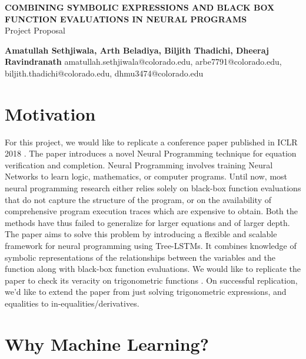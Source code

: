 \documentclass{article}
\begin{document}
\begin{center}
	\LARGE{\textbf{COMBINING SYMBOLIC EXPRESSIONS AND BLACK BOX FUNCTION EVALUATIONS IN NEURAL PROGRAMS}} \\
    \vspace{1em}
    \Large{Project Proposal} \\
    \vspace{1em}
        
    \normalsize\textbf{Amatullah Sethjiwala, Arth Beladiya, Biljith Thadichi, Dheeraj Ravindranath} 
    \normalsize{amatullah.sethjiwala@colorado.edu, arbe7791@colorado.edu, biljith.thadichi@colorado.edu, dhmu3474@colorado.edu}
\end{center}
	
\begin{normalsize}
    
\section{Motivation}

For this project, we would like to replicate a conference paper published in ICLR 2018 \cite{originalpaper}. The paper introduces a novel Neural Programming technique for equation verification and completion. Neural Programming involves training Neural Networks to learn logic, mathematics, or computer programs. Until now, most neural programming research either relies solely on black-box function evaluations that do not capture the structure of the program, or on the availability of comprehensive program execution traces which are expensive to obtain. Both the methods have thus failed to generalize for larger equations and of larger depth. The paper aims to solve this problem by introducing a flexible and scalable framework for neural programming using Tree-LSTMs. It combines knowledge of symbolic representations of the relationships between the variables and the function along with black-box function evaluations. We would like to replicate the paper to check its veracity on trigonometric functions \cite{trigidentities}. On successful replication, we’d like to extend the paper from just solving trigonometric expressions, and equalities to in-equalities/derivatives. 
      
\section{Why Machine Learning?}
    

\end{normalsize}
\end{document}
